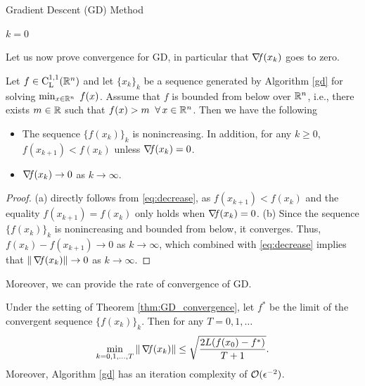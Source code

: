 \documentclass[10pt,a4paper]{article}
\begin{document}
\begin{algorithm}[H]\label{gd}
	\caption{Gradient Descent (GD) Method}
	
	
	$k = 0$
	
\end{algorithm}
\noindent Let us now prove convergence for GD, in particular that $\operatorname*{\mathit{\nabla \!f}}(x_k)$ goes to zero.
\begin{theorem}[Convergence of GD]\label{thm:GD_convergence}
	Let $f\in \mathord{\mathrm{C^{1,1}_{L}}}(\mathbb{R}^n)$ and let $\{x_k\}_k$ be a sequence generated by Algorithm \ref{gd} for solving $\min_{x\in\mathbb{R}^n}\;f(x)$. Assume that $f$ is bounded from below over $\mathbb{R}^n$, i.e., there exists $m\in \mathbb{R}$ such that $f(x)>m \;\; \forall\, x\in \mathbb{R}^n$. Then we have the following
	\begin{itemize}
		\item[(a)] The sequence $\{f(x_k)\}_k$ is nonincreasing. In addition, for any $k\geq 0$, $f(x_{k+1}) < f(x_k)$ unless $\operatorname*{\mathit{\nabla \!f}}(x_k)=0$.
		\item[(b)] $\operatorname*{\mathit{\nabla \!f}}(x_k) \to 0$ as $k\to \infty$.
	\end{itemize}
\end{theorem}
\begin{proof}
	(a) directly follows from \eqref{eq:decrease}, as $f(x_{k+1}) < f(x_k)$ and the equality $f(x_{k+1}) = f(x_k)$ only holds when $\operatorname*{\mathit{\nabla \!f}}(x_k)=0$.
	(b) Since the sequence $\{f(x_k)\}_k$ is nonincreasing and bounded from below, it converges. Thus, $f(x_k) - f(x_{k+1}) \to 0$ as $k\to \infty$, which combined with \eqref{eq:decrease} implies that $\|\operatorname*{\mathit{\nabla \!f}}(x_k)\|\to 0$ as $k\to \infty$.  
\end{proof}
\noindent Moreover, we can provide the rate of convergence of GD.
\begin{theorem}
	Under the setting of Theorem \ref{thm:GD_convergence}, let $f^*$ be the limit of the convergent sequence $\{f(x_k)\}_k$. Then for any $T=0,1, \dots$
	\begin{equation}\label{eq:convergence_rate}
		\min_{k=0,1,\dots, T} \| \operatorname*{\mathit{\nabla \!f}}(x_k) \|\leq \sqrt{\frac{2L (f(x_0) -f^*)}{T+1}}.
	\end{equation}
Moreover, Algorithm \ref{gd} has an iteration complexity of $\mathcal{O}(\epsilon^{-2})$.
\end{theorem}
\end{document}
